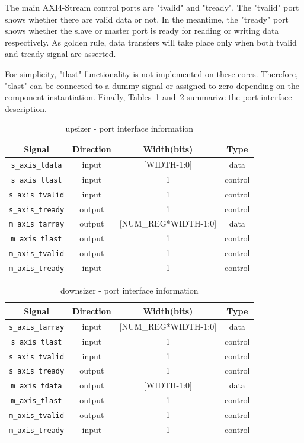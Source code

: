 \documentclass[10pt, conference, compsocconf]{IEEEtran}
\begin{document}
The main AXI4-Stream control ports are "tvalid" and "tready". The "tvalid" port shows whether there are valid data or not. In the meantime, the "tready" port shows whether the
slave or master port is ready for reading or writing data respectively. As golden rule, data transfers will take place only when both tvalid and tready signal are asserted. 

For simplicity, "tlast" functionality is not implemented on these cores. Therefore, "tlast" can be connected to 
a dummy signal or assigned to zero depending on the component instantiation. Finally, Tables~\ref{table:s2p} and~\ref{table:p2s} summarize the port interface description.


\begin{table}[!t]
	\caption{upsizer - port interface information}
    \label{table:s2p}
    \centering    
    \begin{tabular}{ | c | c | c | c |}
    \hline
Signal & Direction & Width(bits) & Type \\ \hline \hline
{\tt s\_axis\_tdata} & input & [WIDTH-1:0] &  data \\ \hline
{\tt s\_axis\_tlast} & input & 1 & control \\  \hline
{\tt s\_axis\_tvalid} & input & 1 & control  \\ \hline
{\tt s\_axis\_tready} & output & 1 & control \\ \hline
{\tt m\_axis\_tarray} & output & [NUM\_REG*WIDTH-1:0] &  data \\ \hline
{\tt m\_axis\_tlast} & output & 1 & control \\  \hline
{\tt m\_axis\_tvalid} & output & 1 & control  \\ \hline
{\tt m\_axis\_tready} & input & 1 & control \\ 
    \hline
    \end{tabular}
\end{table}

\begin{table}[!t]
	\caption{downsizer - port interface information}
    \label{table:p2s}
    \centering
    \begin{tabular}{ | c | c | c | c |}
    \hline
Signal & Direction & Width(bits) & Type \\ \hline \hline
{\tt s\_axis\_tarray} & input & [NUM\_REG*WIDTH-1:0] &  data \\ \hline
{\tt s\_axis\_tlast} & input & 1 & control \\  \hline
{\tt s\_axis\_tvalid} & input & 1 & control  \\ \hline
{\tt s\_axis\_tready} & output & 1 & control \\ \hline
{\tt m\_axis\_tdata} & output & [WIDTH-1:0] &  data \\ \hline
{\tt m\_axis\_tlast} & output & 1 & control \\  \hline
{\tt m\_axis\_tvalid} & output & 1 & control  \\ \hline
{\tt m\_axis\_tready} & input & 1 & control \\ 
    \hline
    \end{tabular}
\end{table}
\end{document}

